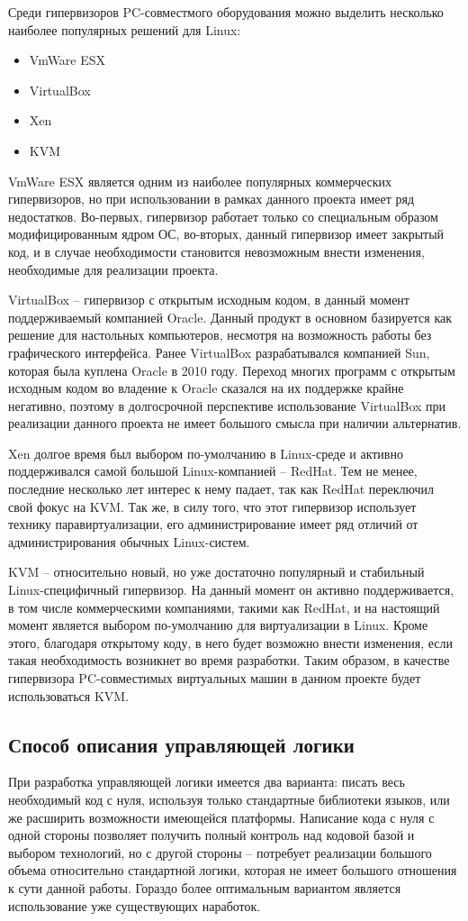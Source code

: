 Среди гипервизоров PC-совместмого оборудования можно выделить несколько наиболее
популярных решений для Linux:
\begin{itemize}
    \item VmWare ESX
    \item VirtualBox
    \item Xen
    \item KVM
\end{itemize}

VmWare ESX является одним из наиболее популярных коммерческих гипервизоров, но при 
использовании в рамках данного проекта имеет ряд недостатков. Во-первых, гипервизор
работает только со специальным образом модифицированным ядром ОС, во-вторых,
данный гипервизор имеет закрытый код, и в случае необходимости становится невозможным
внести изменения, необходимые для реализации проекта.

VirtualBox -- гипервизор с открытым исходным кодом, в данный момент поддерживаемый 
компанией Oracle. Данный продукт в основном базируется как решение для настольных
компьютеров, несмотря на возможность работы без графического интерфейса.
Ранее VirtualBox разрабатывался компанией Sun, которая была куплена Oracle в 2010 году.
Переход многих программ с открытым исходным кодом во владение к Oracle сказался на
их поддержке крайне негативно, поэтому в долгосрочной перспективе использование
VirtualBox при реализации данного проекта не имеет большого смысла при наличии альтернатив.

Xen долгое время был выбором по-умолчанию в Linux-среде и активно поддерживался
самой большой Linux-компанией -- RedHat. %
Тем не менее, последние несколько лет интерес к нему падает, так как
RedHat переключил свой фокус на KVM. Так же, в силу того, что этот гипервизор 
использует технику паравиртуализации, его администрирование имеет ряд отличий
от администрирования обычных Linux-систем.

KVM -- относительно новый, но уже достаточно популярный и стабильный Linux-специфичный
гипервизор. На данный момент он активно поддерживается, в том числе коммерческими компаниями,
такими как RedHat, и на настоящий момент является выбором по-умолчанию для виртуализации в 
Linux. Кроме этого, благодаря открытому коду, в него будет возможно внести изменения,
если такая необходимость возникнет во время разработки.
Таким образом, в качестве гипервизора PC-совместимых виртуальных машин в данном проекте
будет использоваться KVM.

\subsection{Способ описания управляющей логики}
При разработка управляющей логики имеется два варианта: писать весь необходимый код с нуля, 
используя только стандартные библиотеки языков, или же расширить возможности имеющейся
платформы. Написание кода с нуля с одной стороны позволяет получить полный контроль 
над кодовой базой и выбором технологий, но с другой стороны -- потребует реализации
большого объема относительно стандартной логики, которая не имеет большого отношения 
к сути данной работы. Гораздо более оптимальным вариантом является использование уже 
существующих наработок.

